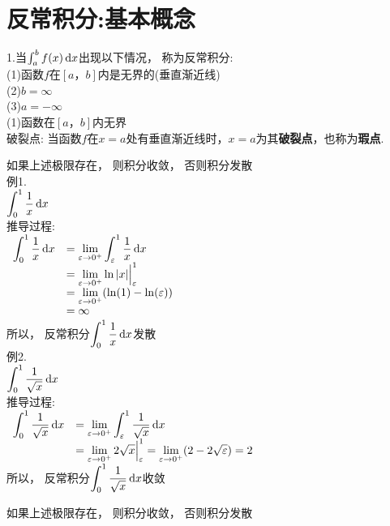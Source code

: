 \chapter{反常积分:基本概念}
1.当$\int_a^bf(x)\mathop{}\!\mathrm{d} x$出现以下情况， 称为反常积分:\\
(1)函数$f$在$[a，b]$内是无界的(垂直渐近线)\\
(2)$b=\infty$\\
(3)$a=-\infty$\\[2ex]

(1)函数在$[a，b]$内无界\\
破裂点: 当函数$f$在$x=a$处有垂直渐近线时，$x=a$为其\textbf{破裂点}，也称为\textbf{瑕点}.
{\par\centering
{}
\par}
如果上述极限存在， 则积分收敛， 否则积分发散\\
例1.\\
$\displaystyle\int_0^1\frac{1}{x}\mathop{}\!\mathrm{d} x$\\
推导过程:\\
$\begin{array}{>{\displaystyle}r >{\displaystyle}l}
\int_0^1\frac{1}{x}\dif x & =\lim_{\varepsilon\to 0^+}\int_{\varepsilon}^1\frac{1}{x}\dif x\\
& =\lim_{\varepsilon\to 0^+}\ln|x|\Big|_{\varepsilon}^1\\
& =\lim_{\varepsilon\to 0^+}(\ln(1)-\ln(\varepsilon))\\
& =\infty
\end{array}$\\
所以， 反常积分$\displaystyle\int_0^1\frac{1}{x}\mathop{}\!\mathrm{d} x$发散\\[2ex]

例2.\\
$\displaystyle\int_0^1\frac{1}{\sqrt{x}}\mathop{}\!\mathrm{d} x$\\
推导过程:\\
$\begin{array}{>{\displaystyle}r >{\displaystyle}l}
\int_0^1\frac{1}{\sqrt{x}}\dif x & =\lim_{\varepsilon\to 0^+}\int_{\varepsilon}^1\frac{1}{\sqrt{x}}\dif x\\
& =\lim_{\varepsilon\to 0^+}2\sqrt{x}\Big|_{\varepsilon}^1=\lim_{\varepsilon\to 0^+}(2-2\sqrt{\varepsilon})=2
\end{array}$\\
所以， 反常积分$\displaystyle\int_0^1\frac{1}{\sqrt{x}}\mathop{}\!\mathrm{d} x$收敛
{\par\centering
{}
\par}
如果上述极限存在， 则积分收敛， 否则积分发散\\

